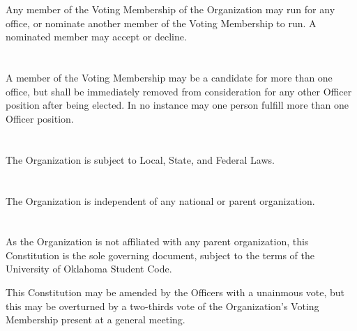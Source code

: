\documentclass[12pt]{cls/constitution}
\begin{document}
\section{}
Any member of the Voting Membership of the Organization may run for any office, or nominate another member of the Voting Membership to run. A nominated member may accept or decline.

\section{}
A member of the Voting Membership may be a candidate for more than one office, but shall be immediately removed from consideration for any other Officer position after being elected. In no instance may one person fulfill more than one Officer position. 


\section{}
The Organization is subject to Local, State, and Federal Laws.

\section{}
The Organization is independent of any national or parent organization.

\section{}
As the Organization is not affiliated with any parent organization, this Constitution is the sole governing document, subject to the terms of the University of Oklahoma Student Code.

This Constitution may be amended by the Officers with a unainmous vote, but this may be overturned by a two-thirds vote of the Organization’s Voting Membership present at a general meeting. 
\end{document}
